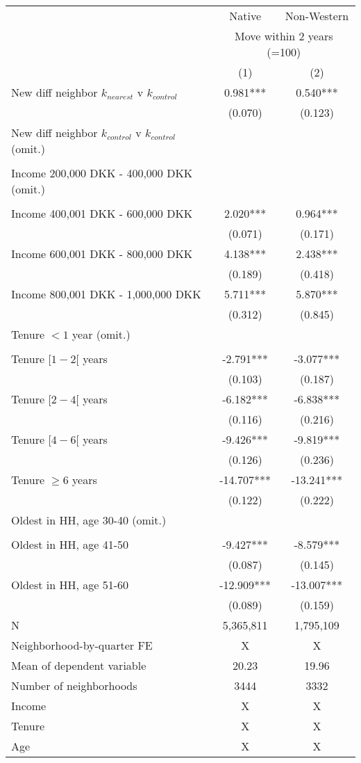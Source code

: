 \begin{tabular}{lcc}
\toprule
 & Native & Non-Western \\ 
\cmidrule(lr){2-2} \cmidrule(lr){3-3}
 & \multicolumn{2}{c}{Move within 2 years (=100)} \\ 
\cmidrule(lr){2-3}
  & (1) & (2) \\ 
\midrule
New diff neighbor $k_{nearest}$ v $k_{control}$ & 0.981*** & 0.540*** \\ 
 & (0.070) & (0.123) \\ 
New diff neighbor $k_{control}$ v $k_{control}$ (omit.) & & \\ 
 &   &   \\ 
Income 200,000 DKK - 400,000 DKK (omit.) &  &  \\ 
 & &  \\ 
Income 400,001 DKK - 600,000 DKK & 2.020*** & 0.964*** \\ 
 & (0.071) & (0.171) \\ 
Income 600,001 DKK - 800,000 DKK & 4.138*** & 2.438*** \\ 
 & (0.189) & (0.418) \\ 
Income 800,001 DKK - 1,000,000 DKK & 5.711*** & 5.870*** \\ 
 & (0.312) & (0.845) \\ 
 Tenure $<1$ year (omit.) &  &  \\ 
 &  &  \\ 
 Tenure $[1-2[$ years & -2.791*** & -3.077*** \\ 
 & (0.103) & (0.187) \\ 
Tenure $[2-4[$ years & -6.182*** & -6.838*** \\ 
 & (0.116) & (0.216) \\ 
Tenure $[4-6[$ years & -9.426*** & -9.819*** \\ 
 & (0.126) & (0.236) \\ 
Tenure $\geq 6$ years & -14.707*** & -13.241*** \\ 
 & (0.122) & (0.222) \\ 
 Oldest in HH, age 30-40 (omit.) &  &  \\ 
 &  &  \\ 
Oldest in HH, age 41-50 & -9.427*** & -8.579*** \\ 
 & (0.087) & (0.145) \\ 
Oldest in HH, age 51-60 & -12.909*** & -13.007*** \\ 
 & (0.089) & (0.159) \\ 
 \midrule
N & 5,365,811 & 1,795,109 \\ 
Neighborhood-by-quarter FE & X & X \\ 
Mean of dependent variable & 20.23 & 19.96 \\ 
Number of neighborhoods & 3444 & 3332 \\ 
Income & X & X \\ 
Tenure & X & X \\ 
Age & X & X \\ 
\bottomrule
\end{tabular}